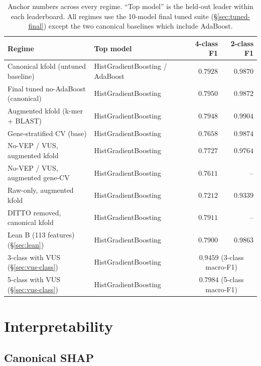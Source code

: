 \documentclass[11pt,a4paper]{article}
\begin{document}
\begin{table}[H]
\centering
\caption{Anchor numbers across every regime. ``Top model'' is the
held-out leader within each leaderboard. All regimes use the 10-model
final tuned suite (\S\ref{sec:tuned-final}) except the two canonical
baselines which include AdaBoost.}
\label{tab:anchors}
\small
\begin{tabular}{llrr}
\toprule
Regime & Top model & 4-class F1 & 2-class F1 \\
\midrule
Canonical kfold (untuned baseline)        & HistGradientBoosting / AdaBoost & $0.7928$ & $0.9870$ \\
Final tuned no-AdaBoost (canonical)       & HistGradientBoosting & $\mathbf{0.7950}$ & $\mathbf{0.9872}$ \\
Augmented kfold (k-mer + BLAST)           & HistGradientBoosting & $0.7948$ & $0.9904$ \\
Gene-stratified CV (base)                 & HistGradientBoosting & $0.7658$ & $0.9874$ \\
No-VEP / VUS, augmented kfold             & HistGradientBoosting & $0.7727$ & $0.9764$ \\
No-VEP / VUS, augmented gene-CV           & HistGradientBoosting & $0.7611$ & --       \\
Raw-only, augmented kfold                 & HistGradientBoosting & $0.7212$ & $0.9339$ \\
DITTO removed, canonical kfold            & HistGradientBoosting & $0.7911$ & --       \\
Lean B (113 features) (\S\ref{sec:lean})  & HistGradientBoosting & $0.7900$ & $0.9863$ \\
3-class with VUS (\S\ref{sec:vus-class})  & HistGradientBoosting & \multicolumn{2}{c}{$0.9459$ (3-class macro-F1)} \\
5-class with VUS (\S\ref{sec:vus-class})  & HistGradientBoosting & \multicolumn{2}{c}{$0.7984$ (5-class macro-F1)} \\
\bottomrule
\end{tabular}
\end{table}

\section{Interpretability}

\subsection{Canonical SHAP}
\end{document}
